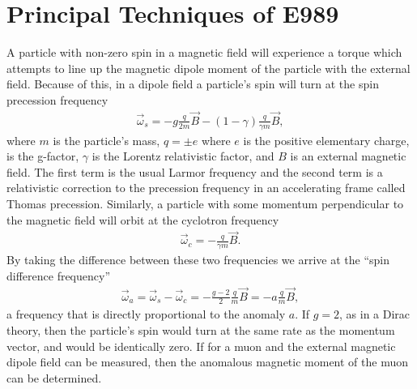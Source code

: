 
\thispagestyle{myheadings}

\graphicspath{{Body/Figures/ExperimentalOverview/Decay/}{Body/Figures/TrackingFigures/TrackerPics/}{Body/Figures/ExperimentalOverview/Ring/}{Body/Figures/ExperimentalOverview/Accelerator/}{Body/Figures/ExperimentalOverview/Beam/}{Body/Figures/ExperimentalOverview/Auxiliary/}{Body/Figures/MagneticField/}}

\chapter{Principal Techniques of E989}
\label{chapter:E989}

A particle with non-zero spin in a magnetic field will experience a torque which attempts to line up the magnetic dipole moment of the particle with the external field. Because of this, in a dipole field a particle's spin will turn at the spin precession frequency \cite{Jackson}
        \begin{align} \label{eq:ws}
            \vec{\omega}_{s} = -g\frac{q}{2m}\vec{B} - (1-\gamma)\frac{q}{\gamma m}\vec{B},
        \end{align}
where $m$ is the particle's mass, $q = \pm e$ where $e$ is the positive elementary charge, \g is the g-factor, $\gamma$ is the Lorentz relativistic factor, and $B$ is an external magnetic field. The first term is the usual Larmor frequency and the second term is a relativistic correction to the precession frequency in an accelerating frame called Thomas precession. Similarly, a particle with some momentum perpendicular to the magnetic field will orbit at the cyclotron frequency
        \begin{align} \label{eq:wc}
            \vec{\omega}_{c} = -\frac{q}{\gamma m}\vec{B}.
        \end{align}
By taking the difference between these two frequencies we arrive at the ``spin difference frequency''
        \begin{align} \label{eq:wasimple}
            \vec{\omega}_{a} = \vec{\omega}_{s} - \vec{\omega}_{c} = -\frac{g-2}{2}\frac{q}{m}\vec{B} = - a \frac{q}{m}\vec{B},
        \end{align}
a frequency that is directly proportional to the anomaly $a$. If $g = 2$, as in a Dirac theory, then the particle's spin would turn at the same rate as the momentum vector, and \wa would be identically zero. If \wa for a muon and the external magnetic dipole field can be measured, then the anomalous magnetic moment of the muon \amu can be determined.

